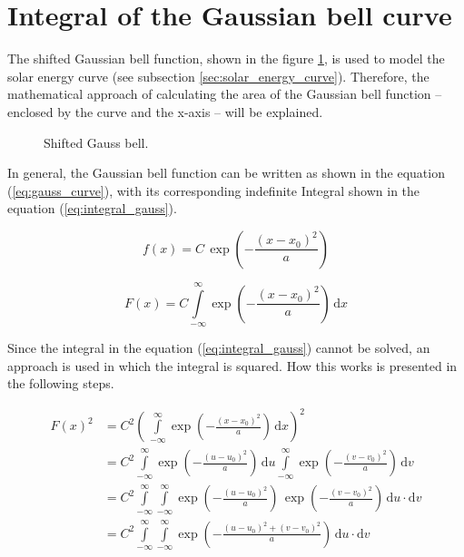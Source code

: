 \section{Integral of the Gaussian bell curve} \label{sec:gauss_general}
The shifted Gaussian bell function, shown in the figure \ref{fig:tikz_gauss_curve_general}, is used to model the solar energy curve (see subsection \ref{sec:solar_energy_curve}). Therefore, the mathematical approach of calculating the area of the Gaussian bell function -- enclosed by the curve and the x-axis -- will be explained.
\begin{figure}[h!]
	\centering
	
	\caption{Shifted Gauss bell.}
	\label{fig:tikz_gauss_curve_general}
\end{figure}

In general, the Gaussian bell function can be written as shown in the equation (\ref{eq:gauss_curve}), with its corresponding indefinite Integral shown in the equation (\ref{eq:integral_gauss}).
\begin{center}
	\begin{equation} \label{eq:gauss_curve}
		f\left(x\right) = C \, \exp\left(-\frac{(x - x_0)^2}{a}\right)
	\end{equation}
\end{center}
\begin{center}
	\begin{equation} \label{eq:integral_gauss}
		F\left(x\right) = C \int\limits_{-\infty}^{\infty} \exp\left(-\frac{(x - x_0)^2}{a}\right)\,\mathrm{d}x
	\end{equation}
\end{center}
Since the integral in the equation (\ref{eq:integral_gauss}) cannot be solved, an approach is used in which the integral is squared. How this works is presented in the following steps.
\begin{center}
	\begin{equation} \label{eq:integral_gauss_partly_solved}
		\begin{aligned}
		F\left(x\right)^2 &= C^2 \left( \, \int\limits_{-\infty}^{\infty} \exp\left(-\frac{(x - x_0)^2}{a}\right)\,\mathrm{d}x\right)^2 \\
		&= C^2 \int\limits_{-\infty}^{\infty} \exp\left(-\frac{(u - u_0)^2}{a}\right)\,\mathrm{d}u \int\limits_{-\infty}^{\infty} \exp\left(-\frac{(v - v_0)^2}{a}\right)\,\mathrm{d}v \\ 
		&= C^2 \int\limits_{-\infty}^{\infty} \int\limits_{-\infty}^{\infty} \exp\left(-\frac{(u - u_0)^2}{a}\right) \, \exp\left(-\frac{(v - v_0)^2}{a}\right) \,\mathrm{d}u \cdot \mathrm{d}v \\
		&= C^2 \int\limits_{-\infty}^{\infty} \int\limits_{-\infty}^{\infty} \exp\left(-\frac{(u - u_0)^2 + (v - v_0)^2}{a}\right) \,\mathrm{d}u \cdot \mathrm{d}v
		\end{aligned}
	\end{equation}
\end{center}
